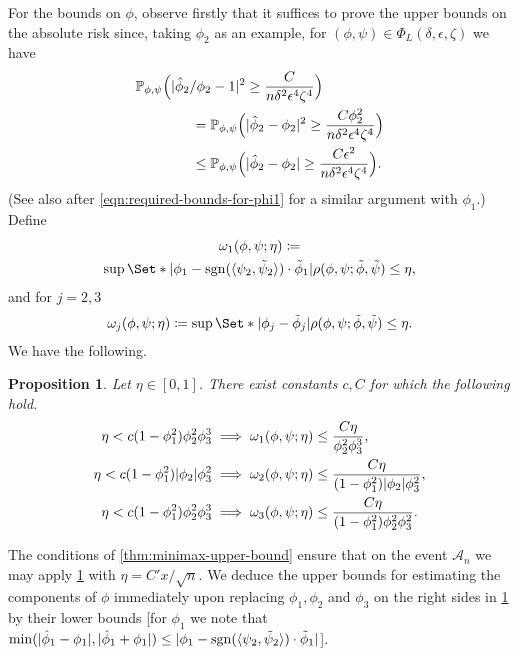 \documentclass[journal]{IEEEtran}
\newtheorem{proposition}{Proposition}
\newcommand{\sgn}{\mathrm{sgn}}
\newcommand{\1}{\boldsymbol{1}}
\DeclareMathOperator{\sign}{sgn}
\newcommand{\PP}{\mathbb{P}}
\providecommand\given{} %
\DeclarePairedDelimiter{\Inner}{\langle}{\rangle}
\DeclarePairedDelimiter{\ip}{\langle}{\rangle}
\DeclarePairedDelimiter{\brackets}{(}{)}
\DeclarePairedDelimiter{\abs}{\lvert}{\rvert}
\begin{document}
For the bounds on $\phi$, observe firstly that it suffices to prove the upper bounds on the absolute risk since, taking $\phi_2$ as an example, for $(\phi,\psi)\in \Phi_L(\delta,\epsilon,\zeta)$ we have
\begin{align}
  &\PP_{\phi,\psi}\brackets[\Big]{\abs{\hat{\phi}_2/\phi_2-1}^2\geq \frac{C}{n\delta^2\epsilon^4\zeta^4}}\nonumber\\
  &\qquad\qquad=  \PP_{\phi,\psi}\brackets[\Big]{\abs{\hat{\phi}_2-\phi_2}^2 \geq \frac{C\phi_2^2}{n\delta^2\epsilon^4\zeta^4}}\nonumber\\
  \label{eqn:absolute-upper-implies-relative}
  &\qquad\qquad\leq \PP_{\phi,\psi}\brackets[\Big]{\abs{\hat{\phi}_2-\phi_2}\geq \frac{C\epsilon^2}{n\delta^2\epsilon^4\zeta^4}}.
\end{align}
(See also after \cref{eqn:required-bounds-for-phi1} for a similar argument with $\phi_1$.)
Define
\begin{multline*}
	\omega_1(\phi,\psi;\eta)%
	\coloneqq\\ \sup\Set*{\abs{\phi_1 - \sgn(\Inner{\psi_2,\tilde{\psi}_2})\cdot \tilde{\phi}_1} \given \rho(\phi,\psi;\tilde{\phi},\tilde{\psi}) \leq \eta },
\end{multline*}
and for $j=2,3$
\begin{equation*}
	\omega_j(\phi,\psi;\eta)%
	\coloneqq%
	\sup\Set*{\abs{\phi_j - \tilde{\phi}_j} \given \rho(\phi,\psi;\tilde{\phi},\tilde{\psi}) \leq \eta }.
\end{equation*}
We have the following.

\begin{proposition}
	\label{pro:modulus:pointwise}
	Let $\eta \in [0,1]$. There exist constants $c,C$ for which the following hold.
	\begin{align*}
		\eta <c (1-\phi_1^2)\phi_2^2\phi_3^3%
		&\implies%
		\omega_1(\phi,\psi;\eta)%
		\leq \frac{C \eta}{\phi_2^2\phi_3^3}, \\
		\eta < c (1-\phi_1^2)\abs{\phi_2}\phi_3^2
		&\implies%
		\omega_2(\phi,\psi;\eta)%
		\leq \frac{C \eta}{(1-\phi_1^2)\abs{\phi_2}\phi_3^2}, \\
		\eta < c (1-\phi_1^2)\phi_2^2\phi_3^3
		&	\implies%
		\omega_3(\phi,\psi;\eta)%
		\leq \frac{C \eta}{(1 - \phi_1^2)\phi_2^2\phi_3^2}.
	\end{align*}
\end{proposition}
The conditions of \cref{thm:minimax-upper-bound} ensure that on the event $\mathcal{A}_n$ we may apply \cref{pro:modulus:pointwise} with $\eta=C'x/\sqrt{n}$. We deduce the upper bounds for estimating the components of $\phi$ immediately upon replacing $\phi_1,\phi_2$ and $\phi_3$ on the right sides in \cref{pro:modulus:pointwise} by their lower bounds [for $\phi_1$ we note that $\min(\abs{\hat{\phi}_1-\phi_1},\abs{\hat{\phi}_1+\phi_1})\leq \abs{\phi_1-\sign(\ip{\psi_2,\tilde{\psi}_2})\cdot \tilde{\phi}_1}$].
\end{document}
